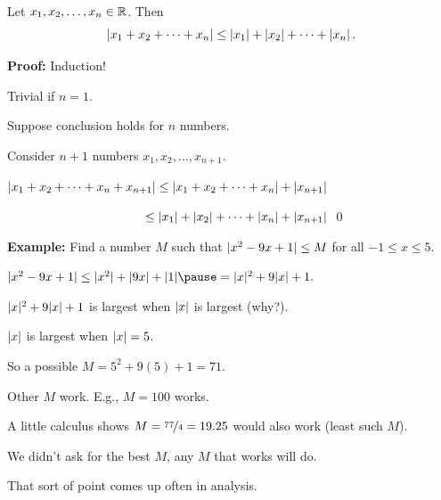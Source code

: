 \documentclass[10pt,aspectratio=169]{beamer}
\begin{document}
\begin{frame}

\begin{corollary}
Let $x_1, x_2, \ldots, x_n \in {\mathbb{R}}$.  Then
\begin{equation*}
\left\lvert {x_1 + x_2 + \cdots + x_n} \right\rvert \leq 
\left\lvert {x_1} \right\rvert + \left\lvert {x_2} \right\rvert + \cdots + \left\lvert {x_n} \right\rvert .
\end{equation*}
\end{corollary}
\pause

\textbf{Proof:}
Induction!

\medskip
\pause

Trivial if $n=1$.

\medskip
\pause

Suppose conclusion holds for $n$ numbers.

\pause
Consider $n+1$ numbers $x_1,x_2,\ldots,x_{n+1}$.

\pause
\medskip

$\displaystyle
\lvert {x_1 + x_2 + \cdots + x_n + x_{n+1}} \rvert \leq 
\lvert {x_1 + x_2 + \cdots + x_n} \rvert + \lvert {x_{n+1}} \rvert$

\medskip
\pause
$\displaystyle
\hspace{1.53in}\leq 
\lvert {x_1} \rvert + \lvert {x_2} \rvert + \cdots + \lvert {x_n} \rvert + \lvert {x_{n+1}} \rvert
$
\qed
\end{frame}

\begin{frame}

\textbf{Example:}
Find a number $M$ such that $\lvert {x^2-9x+1} \rvert \leq M$ for all $-1 \leq x \leq
5$.

\pause
\medskip


$
\sabs{x^2-9x+1} \leq \sabs{x^2}+\sabs{9x}+\sabs{1}
\pause
=
\sabs{x}^2+9\sabs{x}+1 .
$

\medskip
\pause

$\lvert {x} \rvert^2+9\lvert {x} \rvert+1$ is largest when $\left\lvert {x} \right\rvert$ is largest (why?).

\medskip
\pause

$\left\lvert {x} \right\rvert$ is largest when $\left\lvert {x} \right\rvert=5$.

\medskip
\pause

So a possible $M = 5^2+9(5)+1 = 71$.

\medskip
\pause

Other $M$ work.  E.g., $M=100$ works.

\pause
A little calculus shows $M=\nicefrac{77}{4}=19.25$ would also work (least such $M$).

\medskip
\pause

We didn't ask for the best $M$, any $M$ that works will do.

\medskip
\pause

That sort of point comes up often in analysis.

\end{frame}
\end{document}
